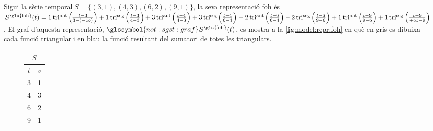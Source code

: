 \begin{example}
  Sigui la sèrie temporal $S=\{ (3,1), (4,3), (6,2), (9,1) \}$, la
  seva representació \gls{foh} és $S^\text{\gls{foh}}(t) =
  1\operatorname{tri}^{\text{ant}}\left(\frac{t-3}{3-(-\infty)}\right)
  + 1\operatorname{tri}^{\text{seg}}\left(\frac{t-3}{4-3}\right)
  +3\operatorname{tri}^{\text{ant}}\left(\frac{t-4}{4-3}\right) +
  3\operatorname{tri}^{\text{seg}}\left(\frac{t-4}{6-4}\right)
  +2\operatorname{tri}^{\text{ant}}\left(\frac{t-6}{6-4}\right) +
  2\operatorname{tri}^{\text{seg}}\left(\frac{t-6}{9-6}\right)
  +1\operatorname{tri}^{\text{ant}}\left(\frac{t-9}{9-6}\right) +
  1\operatorname{tri}^{\text{seg}}\left(\frac{t-9}{+\infty-9}\right)$. El
  graf d'aquesta representació, $\glssymbol{not:sgst:graf}
  S^\text{\gls{foh}}(t)$, es mostra a la \autoref{fig:model:repr:foh}
  en què en gris es dibuixa cada funció triangular i en blau la funció
  resultant del sumatori de totes les triangulars.


  \begin{figure}[tp]
  \centering
  \begin{tabular}[c]{|c|c|}
    \multicolumn{2}{c}{$S$} \\ \hline
    $t$  & $v$ \\ \hline
    3  & 1 \\
    4  & 3 \\
    6  & 2 \\
    9  & 1 \\ \hline
  \end{tabular} \qquad
\end{figure}
\end{example}
